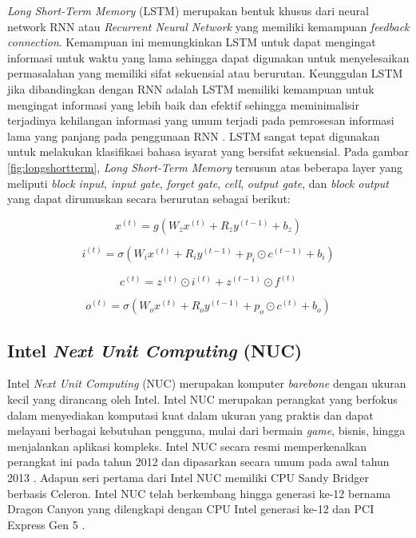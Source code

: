 \textit{Long Short-Term Memory} (LSTM) merupakan bentuk khusus dari neural network RNN atau \textit{Recurrent Neural Network} yang memiliki kemampuan \textit{feedback connection}. Kemampuan ini memungkinkan LSTM untuk dapat mengingat informasi untuk waktu yang lama sehingga dapat digunakan untuk menyelesaikan permasalahan yang memiliki sifat sekuensial atau berurutan. Keunggulan LSTM jika dibandingkan dengan RNN adalah LSTM memiliki kemampuan untuk mengingat informasi yang lebih baik dan efektif sehingga meminimalisir terjadinya kehilangan informasi yang umum terjadi pada pemrosesan informasi lama yang panjang pada penggunaan RNN \cite{xia2020}. LSTM sangat tepat digunakan untuk melakukan klasifikasi bahasa isyarat yang bersifat sekuensial. Pada gambar \ref{fig:longshortterm}, \textit{Long Short-Term Memory} tersusun atas beberapa layer yang meliputi \textit{block input}, \textit{input gate}, \textit{forget gate}, \textit{cell}, \textit{output gate}, dan \textit{block output} yang dapat dirumuskan secara berurutan sebagai berikut:

\begin{equation}
    \label{eq:blockinputLSTM}
    x^{(t)} = g(W_z x^{(t)} + R_z y^{(t-1)} + b_z)
  \end{equation}

  \begin{equation}
    \label{eq:inputgateLSTM}
    i^{(t)} = \sigma(W_i x^{(t)} + R_i y^{(t-1)}+ p_i \odot c^{(t-1)} + b_i)
\end{equation}

\begin{equation}
    \label{eq:cellLSTM}
    c^{(t)} =  z^{(t)} \odot  i^{(t)} + z^{(t-1)} \odot  f^{(t)}
\end{equation}

\begin{equation}
    \label{eq:outputgateLSTM}
    o^{(t)} = \sigma(W_o x^{(t)} + R_o y^{(t-1)}+ p_o \odot c^{(t)} + b_o)
\end{equation}

\subsection{Intel \emph{Next Unit Computing} (NUC)}
\label{subsec:intelNUC}

Intel \emph{Next Unit Computing} (NUC) merupakan komputer \emph{barebone} dengan ukuran kecil yang dirancang oleh Intel. Intel NUC merupakan perangkat yang berfokus dalam menyediakan komputasi kuat dalam ukuran yang praktis dan dapat melayani berbagai kebutuhan pengguna, mulai dari bermain \emph{game}, bisnis, hingga menjalankan aplikasi kompleks. Intel NUC secara resmi memperkenalkan perangkat ini pada tahun 2012 dan dipasarkan secara umum pada awal tahun 2013 \cite{IntelNUC2020}. Adapun seri pertama dari Intel NUC memiliki CPU Sandy Bridger berbasis Celeron. Intel NUC telah berkembang hingga generasi ke-12 bernama Dragon Canyon yang dilengkapi dengan CPU Intel generasi ke-12 dan PCI Express Gen 5 \cite{Halfacree2013}.

